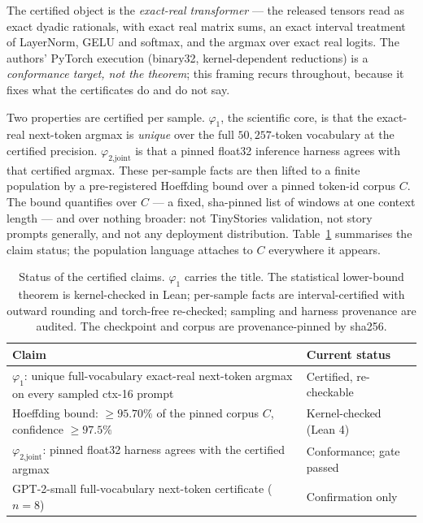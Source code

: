 \documentclass[11pt,a4paper]{article}
\begin{document}
The certified object is the \emph{exact-real transformer} --- the released tensors read as exact dyadic rationals, with exact real matrix sums, an exact interval treatment of LayerNorm, GELU and softmax, and the argmax over exact real logits. The authors' PyTorch execution (binary32, kernel-dependent reductions) is a \emph{conformance target, not the theorem}; this framing recurs throughout, because it fixes what the certificates do and do not say.

Two properties are certified per sample. \(\varphi_1\), the scientific core, is that the exact-real next-token argmax is \emph{unique} over the full \(50{,}257\)-token vocabulary at the certified precision. \(\varphi_{2\text{,joint}}\) is that a pinned float32 inference harness agrees with that certified argmax. These per-sample facts are then lifted to a finite population by a pre-registered Hoeffding bound over a pinned token-id corpus \(C\). The bound quantifies over \(C\) --- a fixed, sha-pinned list of windows at one context length --- and over nothing broader: not TinyStories validation, not story prompts generally, and not any deployment distribution. Table~\ref{tab:status} summarises the claim status; the population language attaches to \(C\) everywhere it appears.

\begin{table}[h]
\centering
\small
\begin{tabular}{@{}p{9.8cm}l@{}}
\toprule
\textbf{Claim} & \textbf{Current status} \\
\midrule
\(\varphi_1\): unique full-vocabulary exact-real next-token argmax on every sampled ctx-16 prompt & Certified, re-checkable \\
Hoeffding bound: \(\ge 95.70\%\) of the pinned corpus \(C\), confidence \(\ge 97.5\%\) & Kernel-checked (Lean 4) \\
\(\varphi_{2\text{,joint}}\): pinned float32 harness agrees with the certified argmax & Conformance; gate passed \\
GPT-2-small full-vocabulary next-token certificate (\(n=8\)) & Confirmation only \\
\bottomrule
\end{tabular}
\caption{Status of the certified claims. \(\varphi_1\) carries the title. The statistical lower-bound theorem is kernel-checked in Lean; per-sample facts are interval-certified with outward rounding and torch-free re-checked; sampling and harness provenance are audited. The checkpoint and corpus are provenance-pinned by sha256.}
\label{tab:status}
\end{table}
\end{document}
